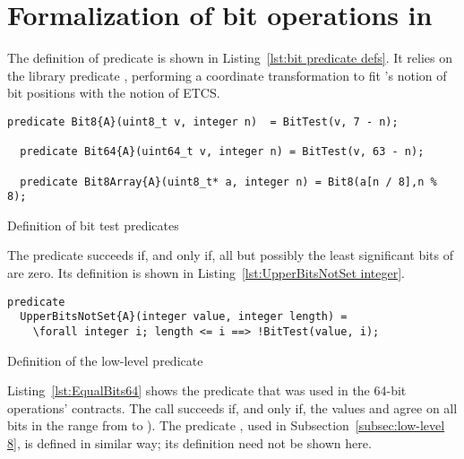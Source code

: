 \clearpage

\section{Formalization of bit operations in \framac}
\label{sec:bit operations in framac}

The definition of predicate  is shown in 
Listing~\ref{lst:bit predicate defs}.
%
It relies on the \framac library predicate ,
performing a coordinate
transformation to fit \framac's notion of bit positions with the
notion of ETCS.

\begin{listing}[hbt]
\begin{minipage}{0.99\textwidth}
\begin{lstlisting}[style=acsl-block]
  predicate Bit8{A}(uint8_t v, integer n)  = BitTest(v, 7 - n);

  predicate Bit64{A}(uint64_t v, integer n) = BitTest(v, 63 - n);

  predicate Bit8Array{A}(uint8_t* a, integer n) = Bit8(a[n / 8],n % 8);
\end{lstlisting}
\end{minipage}
\caption{\label{lst:bit predicate defs}Definition of bit test predicates}
\end{listing}


\FloatBarrier


The predicate  succeeds if,
and only if,
all but possibly 
the least significant  bits of  are zero.
%
Its definition is shown in Listing~\ref{lst:UpperBitsNotSet integer}.


\begin{listing}[hbt]
\begin{minipage}{0.99\textwidth}
\begin{lstlisting}[style=acsl-block]
predicate
  UpperBitsNotSet{A}(integer value, integer length) =
    \forall integer i; length <= i ==> !BitTest(value, i);
\end{lstlisting}
\end{minipage}
\caption{\label{lst:UpperBitsNotSet integer}
	Definition of the low-level predicate }
\end{listing}

\FloatBarrier


Listing~\ref{lst:EqualBits64} shows the predicate
 that was used in the 64-bit
operations' contracts.
%
The call  succeeds if, and only
if, the  values   and  
agree on all bits in the range from  to ).
%
The predicate , used in
Subsection~\ref{subsec:low-level 8}, is defined in similar way; its
definition need not be shown here.


